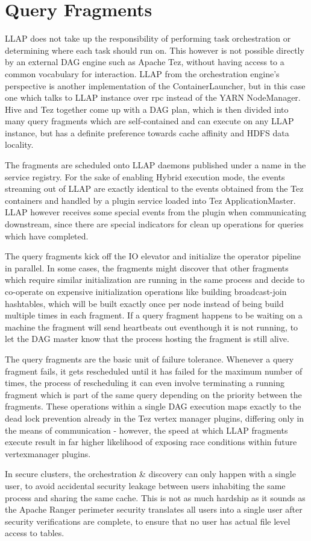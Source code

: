\section{Query Fragments}

LLAP does not take up the responsibility of performing task orchestration or determining where each task should run on. 
This however is not possible directly by an external DAG engine such as Apache Tez\cite{tez}, without having access to
a common vocabulary for interaction. LLAP from the orchestration engine's perspective is another implementation of the
ContainerLauncher, but in this case one which talks to LLAP instance over rpc instead of the YARN NodeManager. Hive and
Tez together come up with a DAG plan, which is then divided into many query fragments which are self-contained and can 
execute on any LLAP instance, but has a definite preference towards cache affinity and HDFS data locality.

The fragments are scheduled onto LLAP daemons published under a name in the service registry. For the sake of enabling 
Hybrid execution mode, the events streaming out of LLAP are exactly identical to the events obtained from the Tez containers
and handled by a plugin service loaded into Tez ApplicationMaster. LLAP however receives some special events from the
plugin when communicating downstream, since there are special indicators for clean up operations for queries which have
completed.

The query fragments kick off the IO elevator and initialize the operator pipeline in parallel. In some cases, the fragments
might discover that other fragments which require similar initialization are running in the same process and decide to 
co-operate on expensive initialization operations like building broadcast-join hashtables, which will be built exactly once
per node instead of being build multiple times in each fragment. If a query fragment happens to be waiting on a machine the
fragment will send heartbeats out eventhough it is not running, to let the DAG master know that the process hosting the
fragment is still alive.

The query fragments are the basic unit of failure tolerance. Whenever a query fragment fails, it gets rescheduled until it
has failed for the maximum number of times, the process of rescheduling it can even involve terminating a running fragment
which is part of the same query depending on the priority between the fragments. These operations within a single DAG execution
maps exactly to the dead lock prevention already in the Tez vertex manager plugins, differing only in the means of communication -
however, the speed at which LLAP fragments execute result in far higher likelihood of exposing race conditions within future 
vertexmanager plugins.


In secure clusters, the orchestration \& discovery can only happen with a single user, to avoid accidental security leakage
between users inhabiting the same process and sharing the same cache. This is not as much hardship as it sounds as the 
Apache Ranger\cite{ranger} perimeter security translates all users into a single user after security verifications are 
complete, to ensure that no user has actual file level access to tables.

